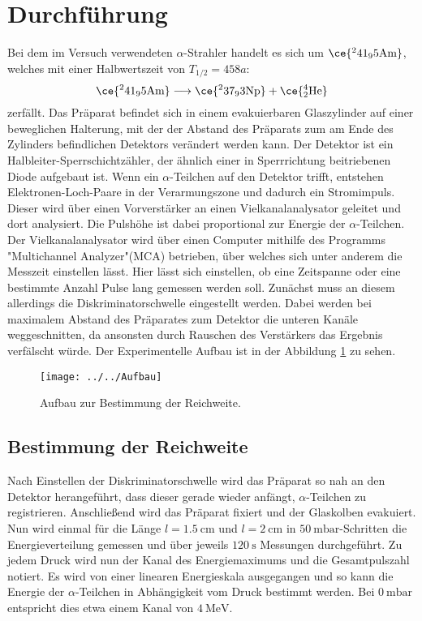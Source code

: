 \section{Durchführung}
\label{sec:Durchführung}
Bei dem im Versuch verwendeten $\alpha$-Strahler handelt es sich um $\ce{^241_95\text{Am}}$, welches mit einer Halbwertszeit von $T_{1/2} = 458 a$:
\begin{equation}
\ce{^241_95\text{Am}} \longrightarrow \ce{^237_93\text{Np}} + \ce{^4_2\text{He}}
\end{equation}
zerfällt. Das Präparat befindet sich in einem evakuierbaren Glaszylinder auf einer beweglichen Halterung, mit der der Abstand des Präparats zum am Ende des Zylinders befindlichen Detektors verändert werden kann. Der Detektor ist ein Halbleiter-Sperrschichtzähler, der ähnlich einer in Sperrrichtung beitriebenen Diode aufgebaut ist. Wenn ein $\alpha$-Teilchen auf den Detektor trifft, entstehen Elektronen-Loch-Paare in der Verarmungszone und dadurch ein Stromimpuls. Dieser wird über einen Vorverstärker an einen Vielkanalanalysator geleitet und dort analysiert. Die Pulshöhe ist dabei proportional zur Energie der $\alpha$-Teilchen. Der Vielkanalanalysator wird über einen Computer mithilfe des Programms "Multichannel Analyzer"(MCA) betrieben, über welches sich unter anderem die Messzeit einstellen lässt. Hier lässt sich einstellen, ob eine Zeitspanne oder eine bestimmte Anzahl Pulse lang gemessen werden soll. Zunächst muss an diesem allerdings die Diskriminatorschwelle eingestellt werden. Dabei werden bei maximalem Abstand des Präparates zum Detektor die unteren Kanäle weggeschnitten, da ansonsten durch Rauschen des Verstärkers das Ergebnis verfälscht würde. Der Experimentelle Aufbau ist in der Abbildung \ref{fig:aufbau} zu sehen. 

\begin{figure}[h!]
	\centering
	\texttt{[image: ../../Aufbau]}
	\caption{Aufbau zur Bestimmung der Reichweite.}
	\label{fig:aufbau}
\end{figure}

\subsection{Bestimmung der Reichweite}
Nach Einstellen der Diskriminatorschwelle wird das Präparat so nah an den Detektor herangeführt, dass dieser gerade wieder anfängt, $\alpha$-Teilchen zu registrieren. Anschließend wird das Präparat fixiert und der Glaskolben evakuiert. Nun wird einmal für die Länge $l = \SI{1,5}{\cm}$ und $l = \SI{2}{\cm}$ in $\SI{50}{\milli\bar}$-Schritten die Energieverteilung gemessen und über jeweils $\SI{120}{\second}$ Messungen durchgeführt. Zu jedem Druck wird nun der Kanal des Energiemaximums und die Gesamtpulszahl notiert. Es wird von einer linearen Energieskala ausgegangen und so kann die Energie der $\alpha$-Teilchen in Abhängigkeit vom Druck bestimmt werden. Bei $\SI{0}{\milli\bar}$ entspricht dies etwa einem Kanal von $\SI{4}{\mega\electronvolt}$.

